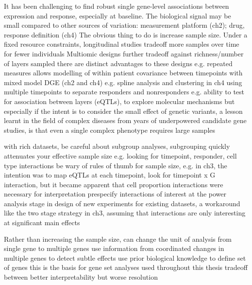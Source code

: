 \begin{outline}
\1 It has been challenging to find robust single gene-level associations between expression and response, especially at baseline.
    \2 The biological signal may be small compared to other sources of variation: measurement platform (ch2); drug, response definition (ch4)
    \2 The obvious thing to do is increase sample size.
        \3 Under a fixed resource constraints, longitudinal studies tradeoff more samples over time for fewer individuals
        \3 Multiomic designs further tradeoff against richness/number of layers sampled
    \2 there are distinct advantages to these designs
        \3 e.g. repeated measures allows modelling of within patient covariance between timepoints with mixed model DGE (ch2 and ch4)
        \3 e.g. spline analysis and clustering in ch4 using multiple timepoints to separate responders and nonresponders
        \3 e.g. ability to test for association between layers (eQTLs), to explore molecular mechanisms
    \2 but especially if the intent is to consider the small effect of genetic variants, a lesson learnt in the field of complex diseases from years of underpowered candidate gene studies, is that even a single complex phenotype requires large samples

\1 with rich datasets, be careful about subgroup analyses, subgrouping quickly attenuates your effective sample size
    \2 e.g. looking for timepoint, responder, cell type interactions
    \2 be wary of rules of thumb for sample size,         
        \3 e.g. in ch3, the intention was to map eQTLs at each timepoint, look for timepoint x G interaction, but it became apparent that cell proportion interactions were necessary for interpretation
    \2 prespecify interactions of interest at the power analysis stage in design of new experiments
    \2 for existing datasets, a workaround like the two stage strategy in ch3, assuming that interactions are only interesting at significant main effects

\1 Rather than increasing the sample size, can change the unit of analysis from single gene to multiple genes
    \2 use information from coordinated changes in multiple genes to detect subtle effects
    \2 use prior biological knowledge to define set of genes
    \2 this is the basis for gene set analyses used throughout this thesis
    \2 tradeoff between better interpretability but worse resolution


\end{outline}
